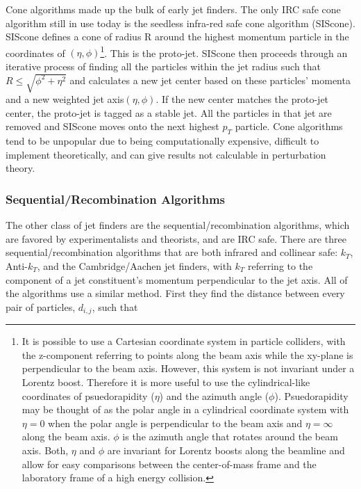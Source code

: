 Cone algorithms made up the bulk of early jet finders.  The only IRC safe cone algorithm still in use today is the seedless infra-red safe cone algorithm (SIScone).  SIScone defines a cone of radius R around the highest momentum particle in the coordinates of $(\eta,\phi)$\footnote{It is possible to use a Cartesian coordinate system in particle colliders, with the z-component referring to points along the beam axis while the xy-plane is perpendicular to the beam axis.  However, this system is not invariant under a Lorentz boost.  Therefore it is more useful to use the cylindrical-like coordinates of psuedorapidity ($\eta$) and the azimuth angle ($\phi$). Psuedorapidity may be thought of as the polar angle in a cylindrical coordinate system with $\eta = 0$ when the polar angle is perpendicular to the beam axis and $\eta = \infty$ along the beam axis.  $\phi$ is the azimuth angle that rotates around the beam axis.  Both, $\eta$ and $\phi$ are invariant for Lorentz boosts along the beamline and allow for easy comparisons between the center-of-mass frame and the laboratory frame of a high energy collision.}.  This is the proto-jet.  SIScone then proceeds through an iterative process of finding all the particles within the jet radius such that $R \leq \sqrt{\phi^{2} + \eta^{2}}$ and calculates a new jet center based on these particles' momenta and a new weighted jet axis$(\eta,\phi)$.  If the new center matches the proto-jet center, the proto-jet is tagged as a stable jet.  All the particles in that jet are removed and SIScone moves onto the next highest $p_{T}$ particle.  Cone algorithms tend to be unpopular due to being computationally expensive, difficult to implement theoretically, and can give results not calculable in perturbation theory.

\subsubsection{Sequential/Recombination Algorithms}

The other class of jet finders are the sequential/recombination algorithms, which are favored by experimentalists and theorists, and are IRC safe.  There are three sequential/recombination algorithms that are both infrared and collinear safe: $k_{T}$, Anti-$k_{T}$, and the Cambridge/Aachen jet finders, with $k_{T}$ referring to the component of a jet constituent's momentum perpendicular to the jet axis.  All of the algorithms use a similar method.  First they find the distance between every pair of particles, $d_{i,j}$,  such that




